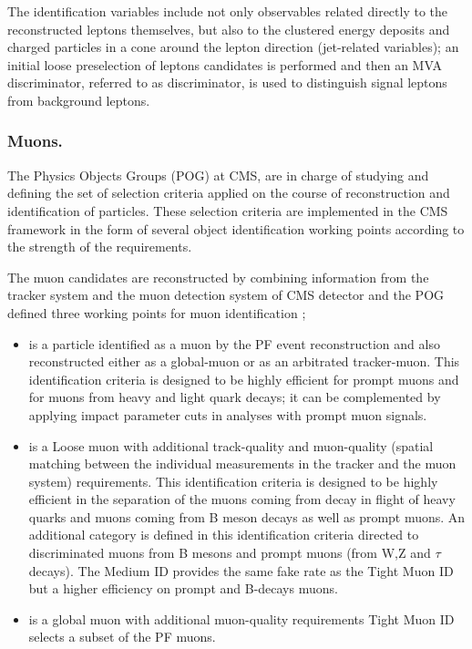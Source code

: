 The identification variables include not only observables related directly to the reconstructed leptons themselves, but also to the clustered energy deposits and charged particles in a cone around the lepton direction (jet-related variables); an initial loose preselection of leptons candidates is performed and then an MVA discriminator, referred to as  discriminator, is used to distinguish signal leptons from background leptons.

\subsubsection*{Muons.}

The Physics Objects Groups (POG) at CMS, are in charge of studying and defining the set of selection criteria applied on the course of reconstruction and identification of particles. These selection criteria are implemented in the CMS framework in the form of several object identification working points according to the strength of the requirements.

The muon candidates are reconstructed by combining information from the tracker system and the muon detection system of CMS detector and the POG defined three working points for muon identification \cite{muid};

\begin{itemize}
\item {} is a particle identified as a muon by the PF event reconstruction and also reconstructed either as a global-muon or as an arbitrated tracker-muon. This identification criteria is designed to be highly efficient for prompt muons and for muons from heavy and light quark decays; it can be complemented by applying impact parameter cuts in analyses with prompt muon signals.
\item {} is a Loose muon with additional track-quality and muon-quality (spatial matching between the individual measurements in the tracker and the muon system) requirements. This identification criteria is designed to be highly efficient in the separation of the muons coming from decay in flight of heavy quarks and muons coming from B meson decays as well as prompt muons. An additional category  is defined in this identification criteria directed to discriminated muons from B mesons and prompt muons (from W,Z and $\tau$ decays). The Medium ID provides the same fake rate as the Tight Muon ID but a higher efficiency on prompt and B-decays muons.\cite{medium_muon}
\item {} is a global muon with additional muon-quality requirements Tight Muon ID selects a subset of the PF muons.  
\end{itemize}

